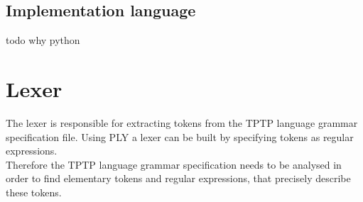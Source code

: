 \subsection{Implementation language}\label{sec:ConceptImplementationLanguage}
todo why python

\section{Lexer}\label{sec:ConceptLexer}
The lexer is responsible for extracting tokens from the TPTP language grammar specification file. Using \ac{PLY} a lexer can be built by specifying tokens as regular expressions.\\
Therefore the TPTP language grammar specification needs to be analysed in order to find elementary tokens and regular expressions, that precisely describe these
tokens. 

%

